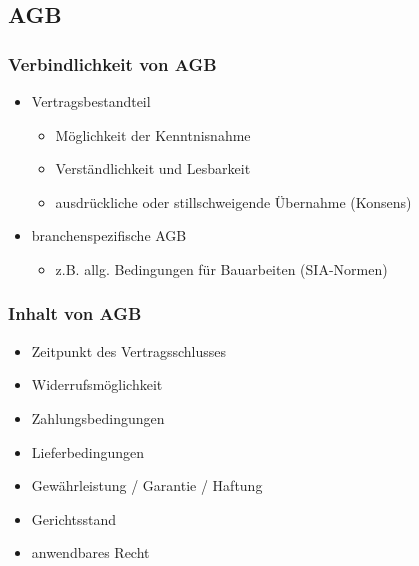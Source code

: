 \subsection{AGB}

\subsubsection{Verbindlichkeit von AGB}
\begin{itemize}
    \item Vertragsbestandteil
    \begin{itemize}
        \item Möglichkeit der Kenntnisnahme
        \item Verständlichkeit und Lesbarkeit
        \item ausdrückliche oder stillschweigende Übernahme (Konsens)
    \end{itemize}
    \item branchenspezifische AGB
    \begin{itemize}
        \item z.B. allg. Bedingungen für Bauarbeiten (SIA-Normen)
    \end{itemize}
\end{itemize}

\subsubsection{Inhalt von AGB}
\begin{minipage}{0.5\linewidth}
    \begin{itemize}
        \item Zeitpunkt des Vertragsschlusses
        \item Widerrufsmöglichkeit
        \item Zahlungsbedingungen
        \item Lieferbedingungen
    \end{itemize}
\end{minipage}
\begin{minipage}{0.5\linewidth}
    \begin{itemize}
        \item Gewährleistung / Garantie / Haftung
        \item Gerichtsstand
        \item anwendbares Recht
    \end{itemize}
\end{minipage}

